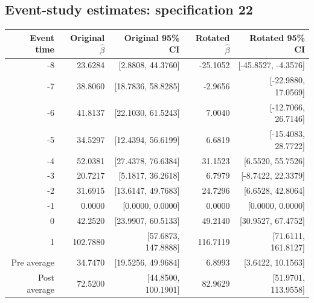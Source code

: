 \documentclass[10pt]{article}
\begin{document}
\subsection*{Event-study estimates: specification 22}
\begin{center}\scriptsize
\begin{tabular}{r rr rr}
\toprule
Event time & Original $\hat\beta$ & Original 95\% CI & Rotated $\hat\beta$ & Rotated 95\% CI \\
\midrule
-8 & 23.6284 & [2.8808, 44.3760] & -25.1052 & [-45.8527, -4.3576] \\
-7 & 38.8060 & [18.7836, 58.8285] & -2.9656 & [-22.9880, 17.0569] \\
-6 & 41.8137 & [22.1030, 61.5243] & 7.0040 & [-12.7066, 26.7146] \\
-5 & 34.5297 & [12.4394, 56.6199] & 6.6819 & [-15.4083, 28.7722] \\
-4 & 52.0381 & [27.4378, 76.6384] & 31.1523 & [6.5520, 55.7526] \\
-3 & 20.7217 & [5.1817, 36.2618] & 6.7979 & [-8.7422, 22.3379] \\
-2 & 31.6915 & [13.6147, 49.7683] & 24.7296 & [6.6528, 42.8064] \\
-1 & 0.0000 & [0.0000, 0.0000] & 0.0000 & [0.0000, 0.0000] \\
0 & 42.2520 & [23.9907, 60.5133] & 49.2140 & [30.9527, 67.4752] \\
1 & 102.7880 & [57.6873, 147.8888] & 116.7119 & [71.6111, 161.8127] \\
\midrule
Pre average & 34.7470 & [19.5256, 49.9684] & 6.8993 & [3.6422, 10.1563] \\
Post average & 72.5200 & [44.8500, 100.1901] & 82.9629 & [51.9701, 113.9558] \\
\bottomrule
\end{tabular}
\end{center}
\clearpage
\end{document}
